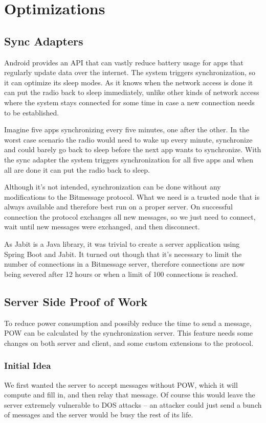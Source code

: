 \documentclass{bfh}
\begin{document}
  \newpage
  \section{Optimizations}
  \subsection{Sync Adapters}
  Android provides an API that can vastly reduce battery usage for apps that regularly update data over the internet. The system triggers synchronization, so it can optimize its sleep modes. As it knows when the network access is done it can put the radio back to sleep immediately, unlike other kinds of network access where the system stays connected for some time in case a new connection needs to be established.

  Imagine five apps synchronizing every five minutes, one after the other. In the worst case scenario the radio would need to wake up every minute, synchronize and could barely go back to sleep before the next app wants to synchronize. With the sync adapter the system triggers synchronization for all five apps and when all are done it can put the radio back to sleep.

  Although it's not intended, synchronization can be done without any modifications to the Bitmessage protocol. What we need is a trusted node that is always available and therefore best run on a proper server. On successful connection the protocol exchanges all new messages, so we just need to connect, wait until new messages were exchanged, and then disconnect.

  As Jabit is a Java library, it was trivial to create a server application using Spring Boot and Jabit. It turned out though that it's necessary to limit the number of connections in a Bitmessage server, therefore connections are now being severed after 12 hours or when a limit of 100 connections is reached.

  \subsection{Server Side Proof of Work}
  To reduce power consumption and possibly reduce the time to send a message, \ac{POW} can be calculated by the synchronization server. This feature needs some changes on both server and client, and some custom extensions to the protocol.

  \subsubsection{Initial Idea}
  We first wanted the server to accept messages without \ac{POW}, which it will compute and fill in, and then relay that message. Of course this would leave the server extremely vulnerable to \ac{DOS} attacks -- an attacker could just send a bunch of messages and the server would be busy the rest of its life.
\end{document}
